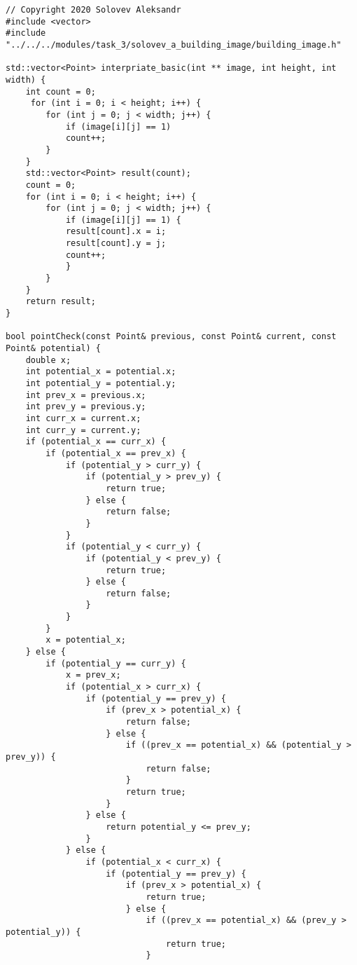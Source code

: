 \documentclass{report}
\begin{document}
\begin{lstlisting}
// Copyright 2020 Solovev Aleksandr
#include <vector>
#include "../../../modules/task_3/solovev_a_building_image/building_image.h"

std::vector<Point> interpriate_basic(int ** image, int height, int width) {
    int count = 0;
     for (int i = 0; i < height; i++) {
        for (int j = 0; j < width; j++) {
            if (image[i][j] == 1)
            count++;
        }
    }
    std::vector<Point> result(count);
    count = 0;
    for (int i = 0; i < height; i++) {
        for (int j = 0; j < width; j++) {
            if (image[i][j] == 1) {
            result[count].x = i;
            result[count].y = j;
            count++;
            }
        }
    }
    return result;
}

bool pointCheck(const Point& previous, const Point& current, const Point& potential) {
    double x;
    int potential_x = potential.x;
    int potential_y = potential.y;
    int prev_x = previous.x;
    int prev_y = previous.y;
    int curr_x = current.x;
    int curr_y = current.y;
    if (potential_x == curr_x) {
        if (potential_x == prev_x) {
            if (potential_y > curr_y) {
                if (potential_y > prev_y) {
                    return true;
                } else {
                    return false;
                }
            }
            if (potential_y < curr_y) {
                if (potential_y < prev_y) {
                    return true;
                } else {
                    return false;
                }
            }
        }
        x = potential_x;
    } else {
        if (potential_y == curr_y) {
            x = prev_x;
            if (potential_x > curr_x) {
                if (potential_y == prev_y) {
                    if (prev_x > potential_x) {
                        return false;
                    } else {
                        if ((prev_x == potential_x) && (potential_y > prev_y)) {
                            return false;
                        }
                        return true;
                    }
                } else {
                    return potential_y <= prev_y;
                }
            } else {
                if (potential_x < curr_x) {
                    if (potential_y == prev_y) {
                        if (prev_x > potential_x) {
                            return true;
                        } else {
                            if ((prev_x == potential_x) && (prev_y > potential_y)) {
                                return true;
                            }

\end{lstlisting}
\end{document}
